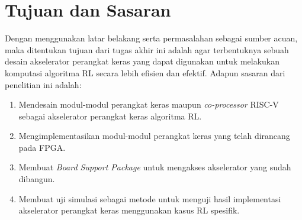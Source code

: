 \section{Tujuan dan Sasaran}

Dengan menggunakan latar belakang serta permasalahan sebagai sumber acuan, maka ditentukan tujuan dari tugas akhir ini adalah agar terbentuknya sebuah desain akselerator perangkat keras yang dapat digunakan untuk melakukan komputasi algoritma RL secara lebih efisien dan efektif. Adapun sasaran dari penelitian ini adalah:

\begin{enumerate}
	\item Mendesain modul-modul perangkat keras maupun \textit{co-processor} RISC-V sebagai akselerator perangkat keras algoritma \ac{RL}.
	\item Mengimplementasikan modul-modul perangkat keras yang telah dirancang pada \acf{FPGA}.
	\item Membuat \textit{Board Support Package} untuk mengakses akselerator yang sudah dibangun.
	\item Membuat uji simulasi sebagai metode untuk menguji hasil implementasi akselerator perangkat keras menggunakan kasus \ac{RL} spesifik.
\end{enumerate}

